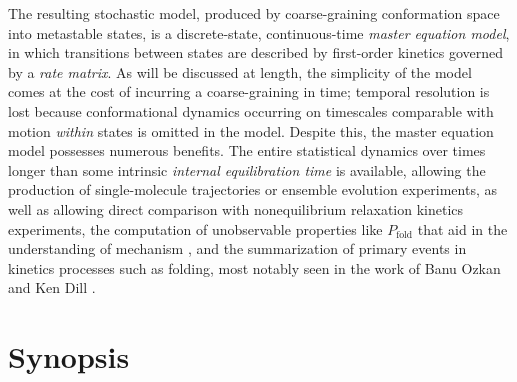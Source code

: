The resulting stochastic model, produced by coarse-graining conformation space into metastable states, is a discrete-state, continuous-time \emph{master equation model}, in which transitions between states are described by first-order kinetics governed by a \emph{rate matrix}.
As will be discussed at length, the simplicity of the model comes at the cost of incurring a coarse-graining in time; temporal resolution is lost because conformational dynamics occurring on timescales comparable with motion \emph{within} states is omitted in the model.
Despite this, the master equation model possesses numerous benefits.
The entire statistical dynamics over times longer than some intrinsic \emph{internal equilibration time} is available, allowing the production of single-molecule trajectories or ensemble evolution experiments, as well as allowing direct comparison with nonequilibrium relaxation kinetics experiments, the computation of unobservable properties like $P_\mathrm{fold}$ \cite{du:1998a} that aid in the understanding of mechanism \cite{lenz:2004a}, and the summarization of primary events in kinetics processes such as folding, most notably seen in the work of Banu Ozkan and Ken Dill \cite{ozkan:2001a,ozkan:2002a}.


\section*{Synopsis}





